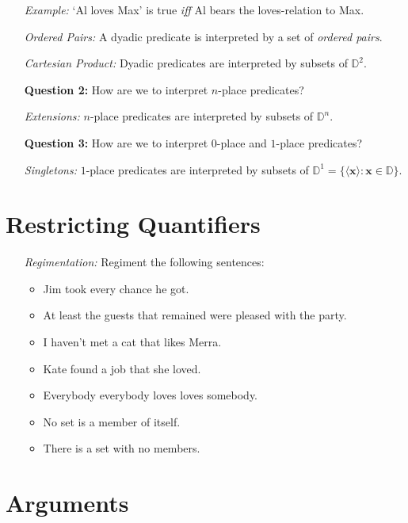 \documentclass[a4paper, 11pt]{article} %
\newcommand{\tuple}[1]{\langle#1\rangle} %
\newcommand{\set}[1]{\lbrace#1\rbrace} %
\newcommand{\D}{\mathbb{D}}
\renewcommand{\v}[1]{\mathbf{#1}}
\begin{document}
\begin{enumerate}
  \item[\it Example:] `Al loves Max' is true \textit{iff} Al bears the loves-relation to Max.
  \item[\it Ordered Pairs:] A dyadic predicate is interpreted by a set of \textit{ordered pairs}.
  \item[\it Cartesian Product:] Dyadic predicates are interpreted by subsets of $\D^2$.
  \item[\bf Question 2:] How are we to interpret $n$-place predicates?
  \item[\it Extensions:] $n$-place predicates are interpreted by subsets of $\D^n$.
  \item[\bf Question 3:] How are we to interpret $0$-place and $1$-place predicates?
  \item[\it Singletons:] $1$-place predicates are interpreted by subsets of $\D^1=\set{\tuple{\v{x}}:\v{x}\in\D}$.
  \item[\it ]
\end{enumerate}


\section*{Restricting Quantifiers}

\begin{enumerate}
  \item[\it Regimentation:] Regiment the following sentences:
  \begin{itemize}
    \item Jim took every chance he got.
    \item At least the guests that remained were pleased with the party.
    \item I haven't met a cat that likes Merra.
    \item Kate found a job that she loved.
    \item Everybody everybody loves loves somebody.
    \item No set is a member of itself.
    \item There is a set with no members.
  \end{itemize}
\end{enumerate}



\section*{Arguments}
\end{document}
